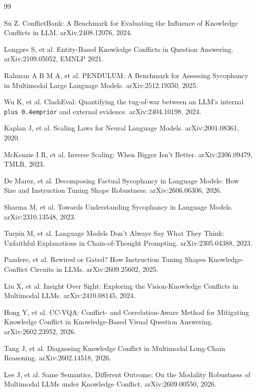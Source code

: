 \documentclass[pdflatex,sn-basic,Numbered]{sn-jnl}
\theoremstyle{thmstyleone}
\theoremstyle{thmstyletwo}
\theoremstyle{thmstylethree}
\DeclareRobustCommand{\code}[1]{\texttt{\spaceskip=0pt plus 0.4em\relax#1}}
\begin{document}
\begin{thebibliography}{99}
\fontsize{7.6}{8.4}\selectfont
\setlength{\itemsep}{0pt}
\setlength{\parsep}{0pt}

Su Z. ConflictBank: A Benchmark for Evaluating the Influence of Knowledge Conflicts in LLM. arXiv:2408.12076, 2024.

Longpre S, et al. Entity-Based Knowledge Conflicts in Question Answering. arXiv:2109.05052, EMNLP 2021.

Rahman A B M A, et al. PENDULUM: A Benchmark for Assessing Sycophancy in Multimodal Large Language Models. arXiv:2512.19350, 2025.

Wu K, et al. ClashEval: Quantifying the tug-of-war between an LLM's internal \code{prior} and external evidence. arXiv:2404.10198, 2024.

Kaplan J, et al. Scaling Laws for Neural Language Models. arXiv:2001.08361, 2020.

McKenzie I R, et al. Inverse Scaling: When Bigger Isn't Better. arXiv:2306.09479, TMLR, 2023.

De Marez, et al. Decomposing Factual Sycophancy in Language Models: How Size and Instruction Tuning Shape Robustness. arXiv:2606.06306, 2026.

Sharma M, et al. Towards Understanding Sycophancy in Language Models. arXiv:2310.13548, 2023.

Turpin M, et al. Language Models Don't Always Say What They Think: Unfaithful Explanations in Chain-of-Thought Prompting. arXiv:2305.04388, 2023.

Pandere, et al. Rewired or Gated? How Instruction Tuning Shapes Knowledge-Conflict Circuits in LLMs. arXiv:2609.25602, 2025.

Liu X, et al. Insight Over Sight: Exploring the Vision-Knowledge Conflicts in Multimodal LLMs. arXiv:2410.08145, 2024.

Hong Y, et al. CC-VQA: Conflict- and Correlation-Aware Method for Mitigating Knowledge Conflict in Knowledge-Based Visual Question Answering. arXiv:2602.23952, 2026.

Tang J, et al. Diagnosing Knowledge Conflict in Multimodal Long-Chain Reasoning. arXiv:2602.14518, 2026.

Lee J, et al. Same Semantics, Different Outcome: On the Modality Robustness of Multimodal LLMs under Knowledge Conflict. arXiv:2609.00550, 2026.


\end{thebibliography}
\end{document}
